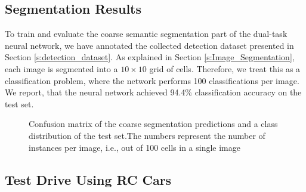 \documentclass{ctuthesis/ctuthesis}
\begin{document}
\subsection{Segmentation Results}
To train and evaluate the coarse semantic segmentation part of the dual-task neural network, we have annotated the collected detection dataset presented in Section \ref{s:detection_dataset}. As explained in Section \ref{s:Image_Segmentation}, each image is segmented into a $10\times 10$ grid of cells. Therefore, we treat this as a classification problem, where the network performs 100 classifications per image. We report, that the neural network achieved 94.4\% classification accuracy on the test set.

\begin{figure}[h]
    \centering
    \quad
    \caption[Confusion matrix of the coarse segmentation predictions and a class distribution of the test set]{Confusion matrix of the coarse segmentation predictions and a class distribution of the test set.The numbers represent the number of instances per image, i.e., out of 100 cells in a single image}
    \label{fig:segmentation_results}%
\end{figure}



\subsection{Test Drive Using RC Cars}
\end{document}
